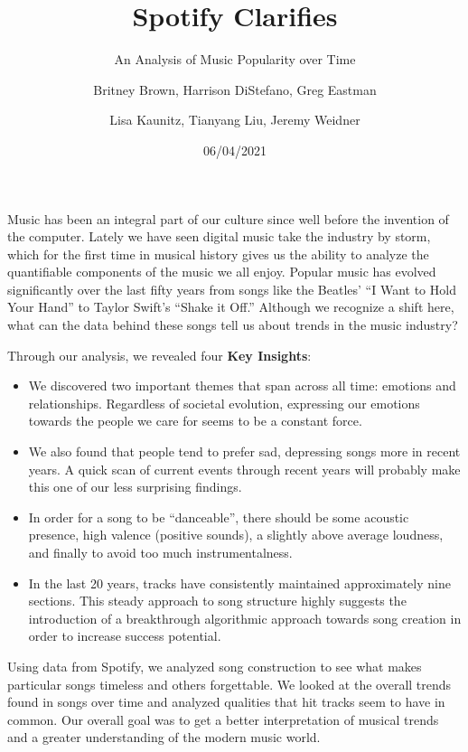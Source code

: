 \documentclass[
  12pt,
]{article}
\title{Spotify Clarifies}
\subtitle{An Analysis of Music Popularity over Time}
\author{Britney Brown, Harrison DiStefano, Greg Eastman \and Lisa
Kaunitz, Tianyang Liu, Jeremy Weidner}
\date{06/04/2021}
\begin{document}
\maketitle

Music has been an integral part of our culture since well before the
invention of the computer. Lately we have seen digital music take the
industry by storm, which for the first time in musical history gives us
the ability to analyze the quantifiable components of the music we all
enjoy. Popular music has evolved significantly over the last fifty years
from songs like the Beatles' ``I Want to Hold Your Hand'' to Taylor
Swift's ``Shake it Off.'' Although we recognize a shift here, what can
the data behind these songs tell us about trends in the music industry?

Through our analysis, we revealed four \textbf{Key Insights}:

\begin{itemize}
\item
  We discovered two important themes that span across all time: emotions
  and relationships. Regardless of societal evolution, expressing our
  emotions towards the people we care for seems to be a constant force.
\item
  We also found that people tend to prefer sad, depressing songs more in
  recent years. A quick scan of current events through recent years will
  probably make this one of our less surprising findings.
\item
  In order for a song to be ``danceable'', there should be some acoustic
  presence, high valence (positive sounds), a slightly above average
  loudness, and finally to avoid too much instrumentalness.
\item
  In the last 20 years, tracks have consistently maintained
  approximately nine sections. This steady approach to song structure
  highly suggests the introduction of a breakthrough algorithmic
  approach towards song creation in order to increase success potential.
\end{itemize}

\vspace{8pt}

Using data from Spotify, we analyzed song construction to see what makes
particular songs timeless and others forgettable. We looked at the
overall trends found in songs over time and analyzed qualities that hit
tracks seem to have in common. Our overall goal was to get a better
interpretation of musical trends and a greater understanding of the
modern music world.
\end{document}
